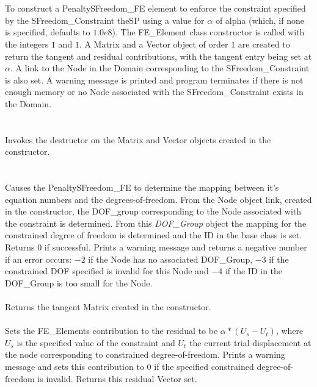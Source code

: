   \\
\\
To construct a PenaltySFreedom\_FE element to enforce the constraint
specified by the SFreedom\_Constraint \p theSP using a value for
$\alpha$ of \p alpha (which, if none is specified, defaults to
$1.0e8$). The FE\_Element class constructor is called with 
the integers $1$ and $1$. A Matrix and a Vector object of order $1$
are created to return the tangent and residual contributions, with the
tangent entry being set at $\alpha$. A link to the Node in the  Domain
corresponding to the SFreedom\_Constraint is also set. A warning message is
printed and program terminates if there is not enough memory or no
Node associated with the SFreedom\_Constraint exists in the Domain.\\

  \\
  \\
Invokes the destructor on the Matrix and Vector objects created in the
constructor. \\

  \\
 \\
Causes the PenaltySFreedom\_FE to determine the mapping between it's equation
numbers and the degrees-of-freedom. From the Node object link, created
in the constructor, the DOF\_group corresponding to the Node
associated with the constraint is determined. From this {\em
DOF\_Group} object the mapping for the constrained degree of freedom
is determined and the ID in the base class is set. Returns $0$ if
successful. Prints a warning message and returns a negative number if
an error occurs: $-2$ if the
Node has no associated DOF\_Group, $-3$ if the constrained DOF
specified is invalid for this Node and $-4$ if the ID in the
DOF\_Group is too small for the Node. \\ 

 \\
Returns the tangent Matrix created in the constructor. \\

 \\
Sets the FE\_Elements contribution to the residual to be
$\alpha * (U_s - U_t)$, where $U_s$ is the specified value of the
constraint and $U_t$ the current trial displacement at the node
corresponding to constrained degree-of-freedom. Prints a warning
message and sets this contribution to $0$ if the specified constrained
degree-of-freedom is invalid. Returns this residual Vector set.


